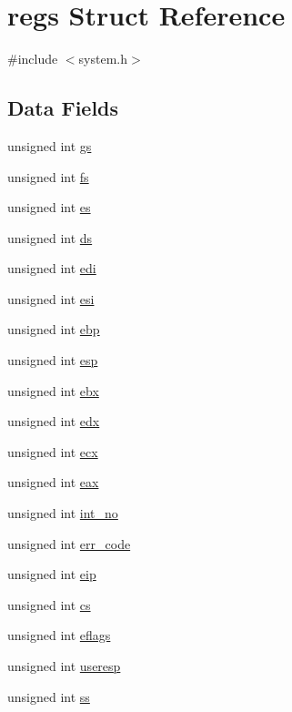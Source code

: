 \hypertarget{structregs}{}\section{regs Struct Reference}
\label{structregs}


{\ttfamily \#include $<$system.\+h$>$}

\subsection*{Data Fields}
\begin{DoxyCompactItemize}
\item 
unsigned int \hyperlink{structregs_a65174883574b177d940de50d85d000ea}{gs}
\item 
unsigned int \hyperlink{structregs_a0a3292601916fad9c8e8463d5466652d}{fs}
\item 
unsigned int \hyperlink{structregs_a8a3e5cd6d92486294b5bdda1963fde40}{es}
\item 
unsigned int \hyperlink{structregs_a11ee12613bc58244d6e3b166e1892f4a}{ds}
\item 
unsigned int \hyperlink{structregs_a273e21e568ee550e48dfc2799e5e7d56}{edi}
\item 
unsigned int \hyperlink{structregs_ab25239e8d63dfa05c9ad2f2ba4a0ff7a}{esi}
\item 
unsigned int \hyperlink{structregs_a27936092be139fd35a48fbcf6d3cc318}{ebp}
\item 
unsigned int \hyperlink{structregs_a6671599aa5e59fd804561c1c1ed7c53a}{esp}
\item 
unsigned int \hyperlink{structregs_a1d732c32ac0bd3f2c0a1b84fed7b6312}{ebx}
\item 
unsigned int \hyperlink{structregs_a5177b6604bc2937159c29899a0a6b94a}{edx}
\item 
unsigned int \hyperlink{structregs_a32f7d03f98565974abed738eee025e62}{ecx}
\item 
unsigned int \hyperlink{structregs_af3ee7124e26955c62234c23ff7420fa5}{eax}
\item 
unsigned int \hyperlink{structregs_a0447d192cd01c7958fc5e06746c345d9}{int\+\_\+no}
\item 
unsigned int \hyperlink{structregs_a37177085b61efd8c7d777880ed814ffe}{err\+\_\+code}
\item 
unsigned int \hyperlink{structregs_a483d469ae6b388e4df869c1ebd61d713}{eip}
\item 
unsigned int \hyperlink{structregs_a178d60c6cd2b033533d4a35b966e8868}{cs}
\item 
unsigned int \hyperlink{structregs_a2394860816e82786acb64671237492b2}{eflags}
\item 
unsigned int \hyperlink{structregs_a55d3b6b0025dd401f204d585d256c140}{useresp}
\item 
unsigned int \hyperlink{structregs_ae24c40e9efb433989445bfd318564c90}{ss}
\end{DoxyCompactItemize}


